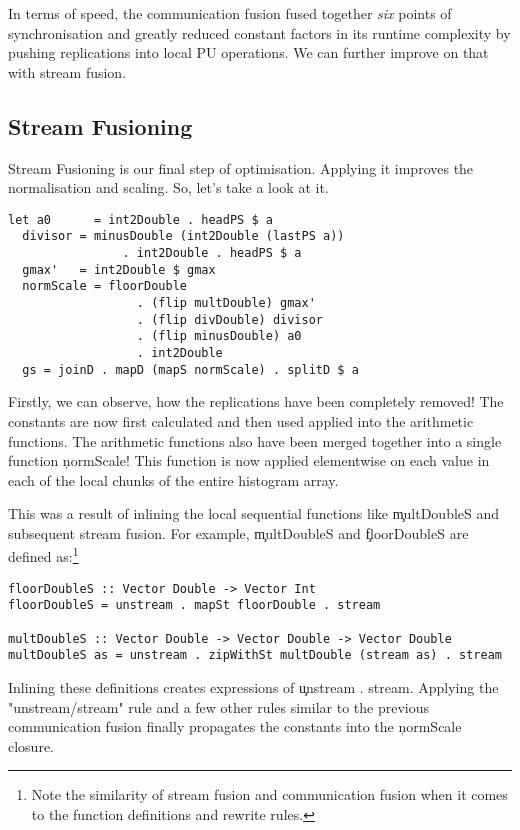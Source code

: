     
    In terms of speed, the communication fusion fused together \emph{six} points of synchronisation
    and greatly reduced constant factors in its runtime complexity by pushing
    replications into local PU operations. We can further improve on that with stream fusion.
    
  \subsection{Stream Fusioning}
    Stream Fusioning is our final step of optimisation. Applying it improves
    the normalisation and scaling. So, let's take a look at it.
    \begin{lstlisting}
let a0      = int2Double . headPS $ a 
  divisor = minusDouble (int2Double (lastPS a))
                . int2Double . headPS $ a
  gmax'   = int2Double $ gmax
  normScale = floorDouble
                  . (flip multDouble) gmax'
                  . (flip divDouble) divisor
                  . (flip minusDouble) a0
                  . int2Double
  gs = joinD . mapD (mapS normScale) . splitD $ a
     \end{lstlisting}
     Firstly, we can observe, how the replications have been completely removed! The
     constants are now first calculated and then used applied into the
     arithmetic functions. The arithmetic functions also have been merged together into
     a single function \c{normScale}! This function is now applied elementwise
     on each value in each of the local chunks of the entire histogram array.
     
     This was a result of inlining the local sequential functions like \c{multDoubleS}
     and subsequent stream fusion. For example, \c{multDoubleS} and \c{floorDoubleS} are defined as:\footnote{Note the similarity of stream fusion and communication fusion when it comes to the function definitions and rewrite rules.}
     \begin{lstlisting}
floorDoubleS :: Vector Double -> Vector Int
floorDoubleS = unstream . mapSt floorDouble . stream

multDoubleS :: Vector Double -> Vector Double -> Vector Double
multDoubleS as = unstream . zipWithSt multDouble (stream as) . stream
     \end{lstlisting}
     Inlining these definitions creates expressions of \c{unstream . stream}. Applying
     the "unstream/stream" rule and a few other rules similar to the previous
     communication fusion finally propagates the constants into the
     \c{normScale} closure.
     
